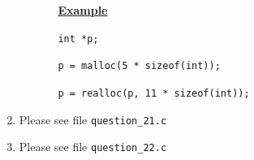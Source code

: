 \documentclass[12pt]{article}
\begin{document}
\begin{enumerate}[1.]
\begin{itemize}
\begin{itemize}
            \bigskip

            \underline{\textbf{Example}}

            \bigskip

            \texttt{int *p;}

            \texttt{p = malloc(5 * sizeof(int));}

            \texttt{p = realloc(p, 11 * sizeof(int));}
        \end{itemize}
    \end{itemize}

    \item

    Please see file \texttt{question\_21.c}

    \item

    Please see file \texttt{question\_22.c}

\end{enumerate}
\end{document}
